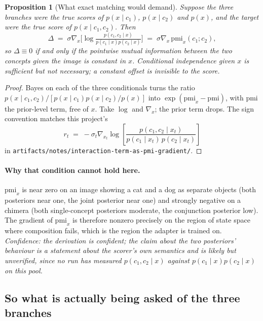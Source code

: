 \documentclass[11pt]{article}
\newcommand{\pmi}{\mathrm{pmi}}
\theoremstyle{plain}
\newtheorem{proposition}{Proposition}
\theoremstyle{remark}
\begin{document}
\begin{proposition}[What exact matching would demand]
\label{prop:pmi}
Suppose the three branches were the true scores of $p(x\mid c_1)$, $p(x\mid c_2)$ and $p(x)$, and
the target were the true score of $p(x \mid c_1, c_2)$. Then
\begin{equation}
  \Delta \;=\; \sigma \nabla_x \Big[\log \tfrac{p(c_1,c_2\mid x)}{p(c_1\mid x)p(c_2\mid x)}\Big]
  \;=\; \sigma \nabla_x\, \pmi_x(c_1;c_2),
\end{equation}
so $\Delta \equiv 0$ if and only if the pointwise mutual information between the two concepts
given the image is constant in $x$. Conditional independence given $x$ is sufficient but not
necessary; a constant offset is invisible to the score.
\end{proposition}
\begin{proof}
Bayes on each of the three conditionals turns the ratio
$p(x\mid c_1,c_2)\big/\!\left[p(x\mid c_1)p(x\mid c_2)/p(x)\right]$ into
$\exp(\pmi_x - \pmi)$, with $\pmi$ the prior-level term, free of $x$. Take $\log$ and
$\nabla_x$; the prior term drops. The sign convention matches this project's
\[
  r_t \;=\; -\sigma_t \nabla_{x_t}\log\!\left[\frac{p(c_1,c_2\mid x_t)}{p(c_1\mid x_t)\,p(c_2\mid x_t)}\right]
\]
in \texttt{artifacts/notes/interaction-term-as-pmi-gradient/}.
\end{proof}

\paragraph{Why that condition cannot hold here.}
$\pmi_x$ is near zero on an image showing a cat and a dog as separate objects (both posteriors
near one, the joint posterior near one) and strongly negative on a chimera (both single-concept
posteriors moderate, the conjunction posterior low). The gradient of $\pmi_x$ is therefore
nonzero precisely on the region of state space where composition fails, which is the region the
adapter is trained on. \emph{Confidence: the derivation is confident; the claim about the two
posteriors' behaviour is a statement about the scorer's own semantics and is likely but
unverified, since no run has measured $p(c_1,c_2\mid x)$ against $p(c_1\mid x)p(c_2\mid x)$ on
this pool.}

\subsection{So what is actually being asked of the three branches}
\end{document}
